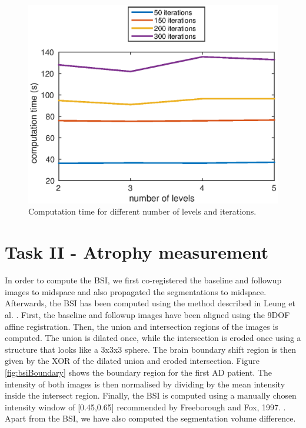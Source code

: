 \documentclass[11pt,a4paper,oneside]{report}
\begin{document}
\begin{figure}
 \centering
 \includegraphics[scale=0.8]{figures/time_params.eps}
 \caption{Computation time for different number of levels and iterations.}
 \label{fig:time}
\end{figure}




\section*{Task II - Atrophy measurement}

In order to compute the BSI, we first co-registered the baseline and followup images to midspace and also propagated the segmentations to midspace. Afterwards, the BSI has been computed using the method described in Leung et al. \cite{leung2010robust}. First, the baseline and followup images have been aligned using the 9DOF affine registration. Then, the union and intersection regions of the images is computed. The union is dilated once, while the intersection is eroded once using a structure that looks like a 3x3x3 sphere. The brain boundary shift region is then given by the XOR of the dilated union and eroded intersection. Figure \ref{fig:bsiBoundary}  shows the boundary region for the first AD patient. The intensity of both images is then normalised by dividing by the mean intensity inside the intersect region. Finally, the BSI is computed using a manually chosen intensity window of [0.45,0.65] recommended by Freeborough and Fox, 1997. \cite{freeborough1997boundary}. Apart from the BSI, we have also computed the segmentation volume difference.
\end{document}
